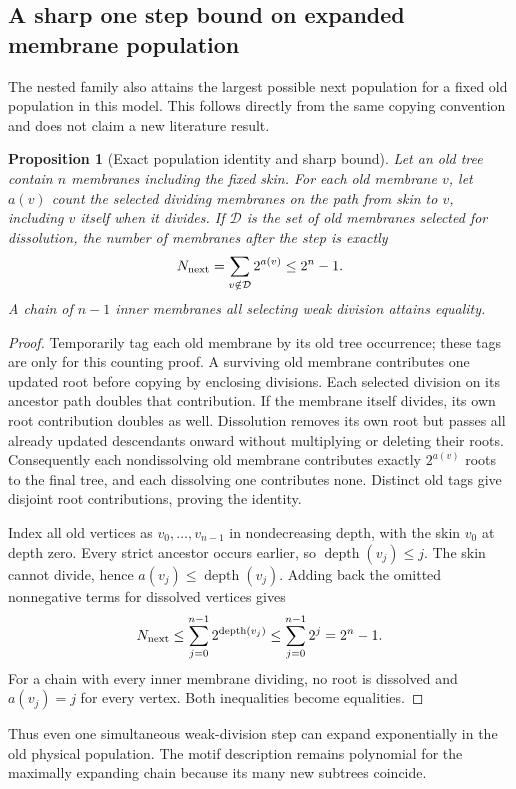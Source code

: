 \documentclass[11pt,letterpaper]{article}
\newtheorem{proposition}[theorem]{Proposition}
\theoremstyle{definition}
\theoremstyle{remark}
\begin{document}
\subsection{A sharp one step bound on expanded membrane population}
The nested family also attains the largest possible next population for a fixed old population in this model. This follows directly from the same copying convention and does not claim a new literature result.

\begin{proposition}[Exact population identity and sharp bound]
Let an old tree contain $n$ membranes including the fixed skin. For each old membrane $v$, let $a(v)$ count the selected dividing membranes on the path from skin to $v$, including $v$ itself when it divides. If $\mathcal D$ is the set of old membranes selected for dissolution, the number of membranes after the step is exactly
\[
 N_{\rm next}=\sum_{v\notin\mathcal D}2^{a(v)}\leq 2^n-1.
\]
A chain of $n-1$ inner membranes all selecting weak division attains equality.
\end{proposition}
\begin{proof}
Temporarily tag each old membrane by its old tree occurrence; these tags are only for this counting proof. A surviving old membrane contributes one updated root before copying by enclosing divisions. Each selected division on its ancestor path doubles that contribution. If the membrane itself divides, its own root contribution doubles as well. Dissolution removes its own root but passes all already updated descendants onward without multiplying or deleting their roots. Consequently each nondissolving old membrane contributes exactly $2^{a(v)}$ roots to the final tree, and each dissolving one contributes none. Distinct old tags give disjoint root contributions, proving the identity.

Index all old vertices as $v_0,\ldots,v_{n-1}$ in nondecreasing depth, with the skin $v_0$ at depth zero. Every strict ancestor occurs earlier, so $\operatorname{depth}(v_j)\leq j$. The skin cannot divide, hence $a(v_j)\leq\operatorname{depth}(v_j)$. Adding back the omitted nonnegative terms for dissolved vertices gives
\[
 N_{\rm next}\leq\sum_{j=0}^{n-1}2^{\operatorname{depth}(v_j)}
 \leq\sum_{j=0}^{n-1}2^j=2^n-1.
\]
For a chain with every inner membrane dividing, no root is dissolved and $a(v_j)=j$ for every vertex. Both inequalities become equalities.
\end{proof}
Thus even one simultaneous weak-division step can expand exponentially in the old physical population. The motif description remains polynomial for the maximally expanding chain because its many new subtrees coincide.
\end{document}
